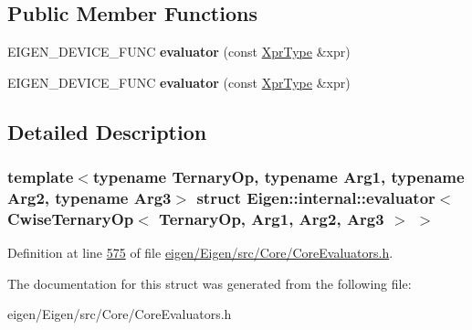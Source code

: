 \subsection*{Public Member Functions}
\begin{DoxyCompactItemize}
\item 
\mbox{\label{struct_eigen_1_1internal_1_1evaluator_3_01_cwise_ternary_op_3_01_ternary_op_00_01_arg1_00_01_arg2_00_01_arg3_01_4_01_4_aae67591bca298a4597b9965a83df5606}} 
E\+I\+G\+E\+N\+\_\+\+D\+E\+V\+I\+C\+E\+\_\+\+F\+U\+NC {\bfseries evaluator} (const \hyperlink{group___core___module_class_eigen_1_1_cwise_ternary_op}{Xpr\+Type} \&xpr)
\item 
\mbox{\label{struct_eigen_1_1internal_1_1evaluator_3_01_cwise_ternary_op_3_01_ternary_op_00_01_arg1_00_01_arg2_00_01_arg3_01_4_01_4_aae67591bca298a4597b9965a83df5606}} 
E\+I\+G\+E\+N\+\_\+\+D\+E\+V\+I\+C\+E\+\_\+\+F\+U\+NC {\bfseries evaluator} (const \hyperlink{group___core___module_class_eigen_1_1_cwise_ternary_op}{Xpr\+Type} \&xpr)
\end{DoxyCompactItemize}


\subsection{Detailed Description}
\subsubsection*{template$<$typename Ternary\+Op, typename Arg1, typename Arg2, typename Arg3$>$\newline
struct Eigen\+::internal\+::evaluator$<$ Cwise\+Ternary\+Op$<$ Ternary\+Op, Arg1, Arg2, Arg3 $>$ $>$}



Definition at line \hyperlink{eigen_2_eigen_2src_2_core_2_core_evaluators_8h_source_l00575}{575} of file \hyperlink{eigen_2_eigen_2src_2_core_2_core_evaluators_8h_source}{eigen/\+Eigen/src/\+Core/\+Core\+Evaluators.\+h}.



The documentation for this struct was generated from the following file\+:\begin{DoxyCompactItemize}
\item 
eigen/\+Eigen/src/\+Core/\+Core\+Evaluators.\+h\end{DoxyCompactItemize}
